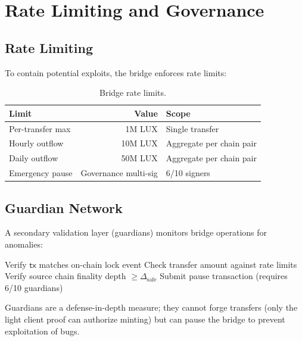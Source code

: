 \documentclass[11pt,a4paper]{article}
\begin{document}
\section{Rate Limiting and Governance}\label{sec:governance}

\subsection{Rate Limiting}

To contain potential exploits, the bridge enforces rate limits:

\begin{table}[H]
\centering
\caption{Bridge rate limits.}
\label{tab:ratelimits}
\begin{tabular}{lrl}
\toprule
\textbf{Limit} & \textbf{Value} & \textbf{Scope} \\
\midrule
Per-transfer max & 1M LUX & Single transfer \\
Hourly outflow & 10M LUX & Aggregate per chain pair \\
Daily outflow & 50M LUX & Aggregate per chain pair \\
Emergency pause & Governance multi-sig & 6/10 signers \\
\bottomrule
\end{tabular}
\end{table}

\subsection{Guardian Network}

A secondary validation layer (guardians) monitors bridge operations for anomalies:

\begin{algorithm}[H]
\caption{Guardian Monitoring}
\label{alg:guardian}
\begin{algorithmic}[1]
    \State Verify $\mathsf{tx}$ matches on-chain lock event
    \State Check transfer amount against rate limits
    \State Verify source chain finality depth $\geq \Delta_{\text{safe}}$
        \State Submit pause transaction (requires 6/10 guardians)
    \EndIf
\EndFor
\end{algorithmic}
\end{algorithm}

Guardians are a defense-in-depth measure; they cannot forge transfers (only the light client proof can authorize minting) but can pause the bridge to prevent exploitation of bugs.
\end{document}
